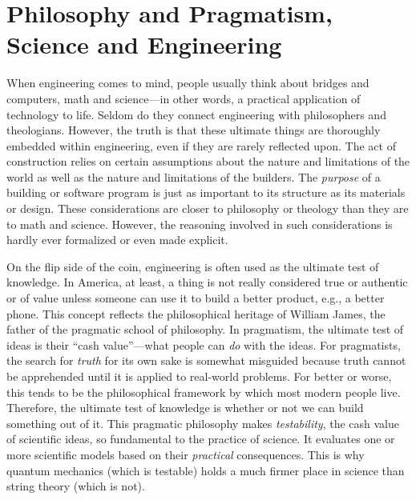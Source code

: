 \setcounter{page}{1}

\section{Philosophy and Pragmatism, Science and Engineering}

When engineering comes to mind, people usually think about bridges and computers, math and science---in other words, a practical application of technology to life.  Seldom do they connect engineering with philosophers and theologians. However, the truth is that these ultimate things are thoroughly embedded within engineering, even if they are rarely reflected upon.  
The act of construction relies on certain assumptions about the nature and limitations of the world as well as the nature and limitations of the builders.  
The \textit{purpose} of a building or software program is just as important to its structure as its materials or design. 
These considerations are closer to philosophy or theology than they are to math and science.  However, the reasoning involved in such considerations is hardly ever
formalized or even made explicit.

On the flip side of the coin, engineering is often used as the ultimate test of knowledge. 
In America, at least, a thing is not really considered true or authentic or of value unless someone can use it to build a better product, e.g., a better phone.  
This concept reflects the philosophical heritage of William James, the father of the pragmatic school of philosophy.  In pragmatism, the ultimate test of ideas is their ``cash value''---what people can \textit{do} with the ideas.  For pragmatists, the search for \textit{truth} for its own sake is somewhat misguided because truth cannot be apprehended until it is applied to real-world problems.  For better or worse, this tends to be the philosophical framework by which most modern people live.  Therefore, the ultimate test of knowledge is whether or not we can build something out of it.  This pragmatic philosophy makes \textit{testability}, the cash value of scientific ideas, so fundamental to the practice of science.  It evaluates one or more scientific models based on their \textit{practical} consequences.  This is why quantum mechanics (which is testable) holds a much firmer place in science than string theory (which is not). 

